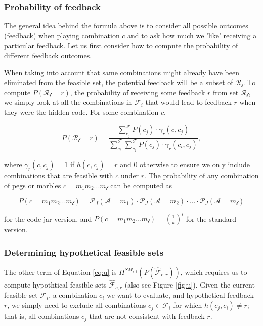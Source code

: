 \documentclass[12pt]{article}
\begin{document}
\subsubsection{Probability of feedback}

The general idea behind the formula above is to consider all possible outcomes (feedback) when playing combination $c$ and to ask how much we 'like' receiving a particular feedback. Let us first consider how to compute the probability of different feedback outcomes. 

When taking into account that same combinations might already have been eliminated from the feasible set, the potential feedback will be a subset of $\mathcal{R_l}$. To compute $P(\mathcal{R_l}=r)$, the probability of receiving some feedback $r$ from set $\mathcal{R_l}$, we simply look at all the combinations in $\mathcal{F}_i$ that would lead to feedback $r$ when they were the hidden code. For some combination $c$,

\[ P(\mathcal{R_l}=r) = \frac{\sum_{c_j}^{\mathcal{F}} P(c_j) \cdot \gamma_r(c, c_j)}{\sum_{c_i}^{\mathcal{F}} \sum_{c_j}^{\mathcal{F}} P(c_j) \cdot \gamma_r(c_i, c_j)}, \]


where $\gamma_r(c, c_j) = 1$ if $h(c, c_j)=r$ and $0$ otherwise to ensure we only include combinations that are feasible with $c$ under $r$. The probability of any combination of pegs or \underline{m}arbles $c=m_1m_2...m_\mathcal{l}$ can be computed as

\label{eq:p}
\begin{equation} 
P(c=m_1m_2...m_\mathcal{l}) = \mathcal{P}_J(\mathcal{A}=m_1) \cdot \mathcal{P}_J(\mathcal{A}=m_2) \cdot ... \cdot \mathcal{P}_J(\mathcal{A}=m_\mathcal{l})
\end{equation} 

for the code jar version, and $P(c=m_1m_2...m_\mathcal{l}) = (\frac{1}{\mathcal{n}})^{l}$ for the standard version.



\subsubsection{Determining hypothetical feasible sets}

The other term of Equation \ref{eq:u} is $H^{SM_{r,t}} ( P(\mathcal{\hat{F}}_{c,r}) )$, which requires us to compute hypothtical feasible sets ${\hat{\mathcal{F}}}_{c,r}$ (also see Figure \ref{fig:u}). Given the current feasible set $\mathcal{F}_i$, a combination $c_i$ we want to evaluate, and hypothetical feedback $r$, we simply need to exclude all combinations $c_j \in \mathcal{F}_i$ for which $h(c_j, c_i) \neq r$; that is, all combinations $c_j$ that are not consistent with feedback $r$.
\end{document}
